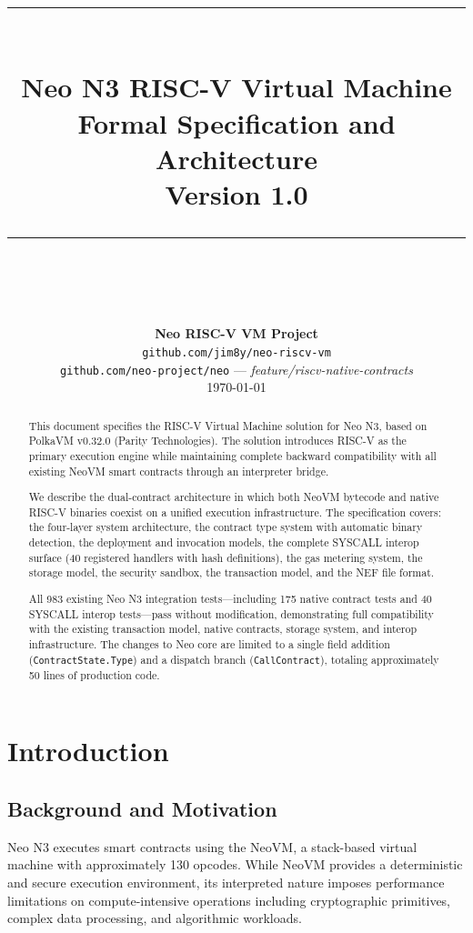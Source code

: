 \documentclass[11pt,a4paper]{article}
\title{
    \vspace{-1cm}
    \rule{\linewidth}{1pt}\\[0.8em]
    {\LARGE\bfseries Neo N3 RISC-V Virtual Machine}\\[0.3em]
    {\Large Formal Specification and Architecture}\\[0.3em]
    {\large Version 1.0}\\[0.5em]
    \rule{\linewidth}{1pt}\\[1.5em]
}
\author{
    \textbf{Neo RISC-V VM Project}\\[0.3em]
    \texttt{github.com/jim8y/neo-riscv-vm}\\[0.5em]
    \texttt{github.com/neo-project/neo} --- \textit{feature/riscv-native-contracts}\\[1em]
    \today
}
\date{}
\begin{document}
\maketitle
\thispagestyle{empty}

\begin{abstract}
\noindent
This document specifies the RISC-V Virtual Machine solution for Neo N3,
based on PolkaVM v0.32.0 (Parity Technologies). The solution introduces
RISC-V as the primary execution engine while maintaining complete backward
compatibility with all existing NeoVM smart contracts through an interpreter
bridge.

We describe the dual-contract architecture in which both NeoVM bytecode and
native RISC-V binaries coexist on a unified execution infrastructure. The
specification covers: the four-layer system architecture, the contract type
system with automatic binary detection, the deployment and invocation models,
the complete SYSCALL interop surface (40 registered handlers with hash
definitions), the gas metering system, the storage model, the security
sandbox, the transaction model, and the NEF file format.

All 983 existing Neo N3 integration tests---including 175 native contract
tests and 40 SYSCALL interop tests---pass without modification, demonstrating
full compatibility with the existing transaction model, native contracts,
storage system, and interop infrastructure. The changes to Neo core are
limited to a single field addition (\texttt{ContractState.Type}) and a
dispatch branch (\texttt{CallContract}), totaling approximately 50 lines of
production code.
\end{abstract}

\tableofcontents
\newpage

\section{Introduction}
\label{sec:introduction}

\subsection{Background and Motivation}

Neo N3 executes smart contracts using the NeoVM, a stack-based virtual machine
with approximately 130 opcodes. While NeoVM provides a deterministic and
secure execution environment, its interpreted nature imposes performance
limitations on compute-intensive operations including cryptographic
primitives, complex data processing, and algorithmic workloads.
\end{document}
